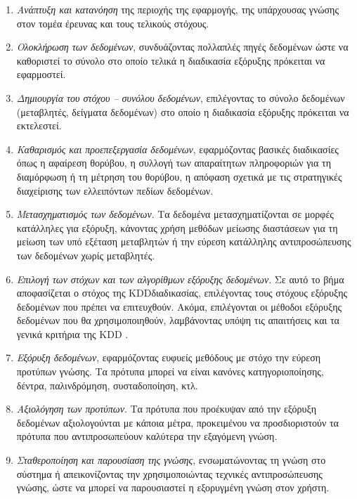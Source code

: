 \documentclass[12pt,twoside,openright]{report}
\begin{document}
\begin{enumerate}
  \item \emph{Ανάπτυξη και κατανόηση} της περιοχής της εφαρμογής, της υπάρχουσας γνώσης στον τομέα έρευνας και τους τελικούς στόχους.
  \item \emph{Ολοκλήρωση των δεδομένων}, συνδυάζοντας πολλαπλές πηγές δεδομένων ώστε να καθοριστεί το σύνολο στο οποίο τελικά η διαδικασία εξόρυξης πρόκειται να εφαρμοστεί.
  \item \emph{Δημιουργία του στόχου – συνόλου δεδομένων}, επιλέγοντας το σύνολο δεδομένων (μεταβλητές, δείγματα δεδομένων) στο οποίο η διαδικασία εξόρυξης πρόκειται να εκτελεστεί.
  \item \emph{Καθαρισμός και προεπεξεργασία δεδομένων}, εφαρμόζοντας βασικές διαδικασίες όπως η αφαίρεση θορύβου, η συλλογή των απαραίτητων πληροφοριών για τη διαμόρφωση ή τη μέτρηση του θορύβου, η απόφαση σχετικά με τις στρατηγικές διαχείρισης των ελλειπόντων πεδίων δεδομένων.
  \item \emph{Μετασχηματισμός των δεδομένων}. Τα δεδομένα μετασχηματίζονται σε μορφές κατάλληλες για εξόρυξη, κάνοντας χρήση μεθόδων μείωσης διαστάσεων για τη μείωση των υπό εξέταση μεταβλητών ή την εύρεση κατάλληλης αντιπροσώπευσης των δεδομένων χωρίς μεταβλητές.
  \item \emph{Επιλογή των στόχων και των αλγορίθμων εξόρυξης δεδομένων}. Σε αυτό το βήμα αποφασίζεται ο στόχος της \lt KDD\gt διαδικασίας, επιλέγοντας τους στόχους εξόρυξης δεδομένων που πρέπει να επιτευχθούν. Ακόμα, επιλέγονται οι μέθοδοι εξόρυξης δεδομένων που θα χρησιμοποιηθούν, λαμβάνοντας υπόψη τις απαιτήσεις και τα γενικά κριτήρια της \lt KDD .
  \item \emph{Εξόρυξη δεδομένων}, εφαρμόζοντας ευφυείς μεθόδους με στόχο την εύρεση προτύπων γνώσης. Τα πρότυπα μπορεί να είναι κανόνες κατηγοριοποίησης, δέντρα, παλινδρόμηση, συσταδοποίηση, κτλ.
  \item \emph{Αξιολόγηση των προτύπων}. Τα πρότυπα που προέκυψαν από την εξόρυξη δεδομένων αξιολογούνται με κάποια μέτρα, προκειμένου να προσδιοριστούν τα πρότυπα που αντιπροσωπεύουν καλύτερα την εξαγόμενη γνώση.
  \item \emph{Σταθεροποίηση και παρουσίαση της γνώσης}, ενσωματώνοντας τη γνώση στο σύστημα ή απεικονίζοντας την χρησιμοποιώντας τεχνικές αντιπροσώπευσης γνώσης, ώστε να μπορεί να παρουσιαστεί η εξορυγμένη γνώση στον χρήστη.
\end{enumerate}
\end{document}
